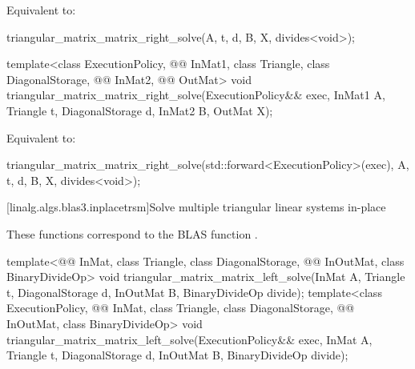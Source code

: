 \begin{itemdescr}
\pnum
\effects
Equivalent to:
\begin{codeblock}
triangular_matrix_matrix_right_solve(A, t, d, B, X, divides<void>{});
\end{codeblock}
\end{itemdescr}

\begin{itemdecl}
template<class ExecutionPolicy, @@ InMat1, class Triangle, class DiagonalStorage,
         @@ InMat2, @@ OutMat>
  void triangular_matrix_matrix_right_solve(ExecutionPolicy&& exec,
                                            InMat1 A, Triangle t, DiagonalStorage d,
                                            InMat2 B, OutMat X);
\end{itemdecl}

\begin{itemdescr}
\pnum
\effects
Equivalent to:
\begin{codeblock}
triangular_matrix_matrix_right_solve(std::forward<ExecutionPolicy>(exec),
                                     A, t, d, B, X, divides<void>{});
\end{codeblock}
\end{itemdescr}

[linalg.algs.blas3.inplacetrsm]{Solve multiple triangular linear systems in-place}

\pnum
\begin{note}
These functions correspond to the BLAS function .
\end{note}

\begin{itemdecl}
template<@@ InMat, class Triangle, class DiagonalStorage,
         @@ InOutMat, class BinaryDivideOp>
  void triangular_matrix_matrix_left_solve(InMat A, Triangle t, DiagonalStorage d,
                                           InOutMat B, BinaryDivideOp divide);
template<class ExecutionPolicy, @@ InMat, class Triangle, class DiagonalStorage,
         @@ InOutMat, class BinaryDivideOp>
  void triangular_matrix_matrix_left_solve(ExecutionPolicy&& exec,
                                           InMat A, Triangle t, DiagonalStorage d,
                                           InOutMat B, BinaryDivideOp divide);
\end{itemdecl}

